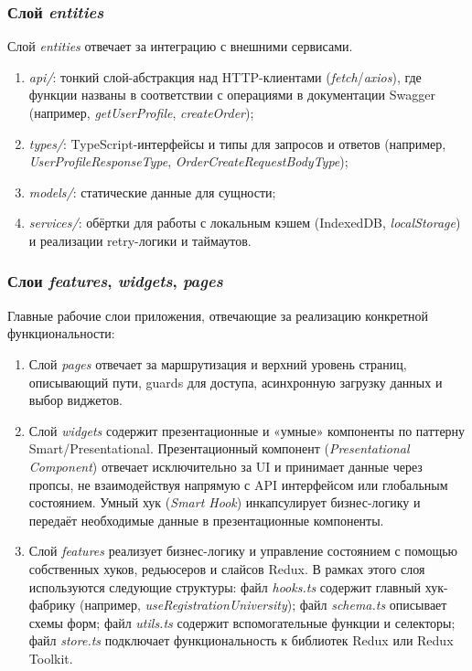 \subsubsection{Слой \textit{entities}}

Слой \textit{entities} отвечает за интеграцию с внешними сервисами.
\begin{enumerate}
  \item \textit{api/}: тонкий слой-абстракция над HTTP-клиентами (\textit{fetch}/\textit{axios}), где функции названы в соответствии с операциями в документации Swagger (например, \textit{getUserProfile}, \textit{createOrder});
  \item \textit{types/}: TypeScript-интерфейсы и типы для запросов и ответов (например, \textit{UserProfileResponseType}, \textit{OrderCreateRequestBodyType});
  \item \textit{models/}: статические данные для сущности;
  \item \textit{services/}: обёртки для работы с локальным кэшем (IndexedDB, \textit{localStorage}) и реализации retry-логики и таймаутов.
\end{enumerate}

\subsubsection{Слои \textit{features}, \textit{widgets}, \textit{pages}}

Главные рабочие слои приложения, отвечающие за реализацию конкретной функциональности:
\begin{enumerate}
  \item Слой \textit{pages} отвечает за маршрутизация и верхний уровень страниц, описывающий пути, guards для доступа, асинхронную загрузку данных и выбор виджетов.
  \item Слой \textit{widgets} содержит презентационные и «умные» компоненты по паттерну Smart/Presentational. Презентационный компонент (\textit{Presentational Component}) отвечает исключительно за UI и принимает данные через пропсы, не взаимодействуя напрямую с API интерфейсом или глобальным состоянием. Умный хук (\textit{Smart Hook}) инкапсулирует бизнес-логику и передаёт необходимые данные в презентационные компоненты.
  \item Слой \textit{features} реализует бизнес-логику и управление состоянием с помощью собственных хуков, редьюсеров и слайсов Redux. В рамках этого слоя используются следующие структуры: файл \textit{hooks.ts} содержит главный хук-фабрику (например, \textit{useRegistrationUniversity}); файл \textit{schema.ts} описывает схемы форм; файл \textit{utils.ts} содержит вспомогательные функции и селекторы; файл \textit{store.ts} подключает функциональность к библиотек Redux или Redux Toolkit.
\end{enumerate}

